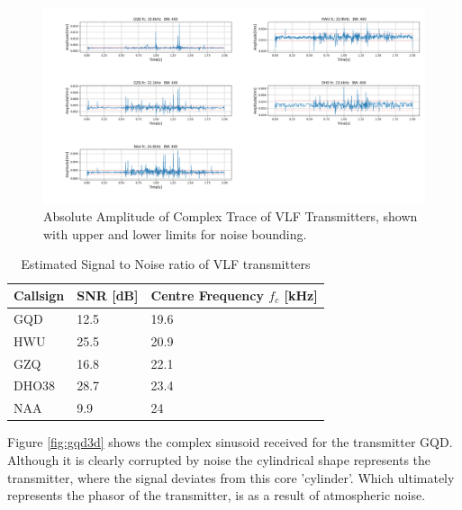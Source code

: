 \begin{figure}[h!]
    \centering
    \includegraphics[width = \textwidth]{figs/sig_character/abs_amplitude.png}
    \caption{\centering Absolute Amplitude of Complex Trace of VLF Transmitters, shown with upper and lower limits for noise bounding.}
    \label{fig:absAmplitude}
\end{figure}

\begin{table}[h!]
\centering
    \begin{tabular}{l|l|l}
    Callsign & SNR [dB] & Centre Frequency $f_c$ [kHz] \\
    \hline
    GQD & 12.5 & 19.6 \\
    HWU & 25.5 & 20.9 \\
    GZQ & 16.8 & 22.1 \\
    DHO38 & 28.7 & 23.4 \\
    NAA & 9.9 & 24
    \end{tabular}
\caption{Estimated Signal to Noise ratio of VLF transmitters}
\label{tab:snr1}
\end{table}

Figure \ref{fig:gqd3d} shows the complex sinusoid received for the transmitter GQD. Although it is clearly corrupted by noise the cylindrical shape represents the transmitter, where the signal deviates from this core 'cylinder'. Which ultimately represents the phasor of the transmitter, is as a result of atmospheric noise. 

